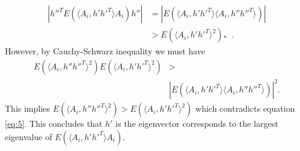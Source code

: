 \documentclass[10pt,journal,compsoc]{IEEEtran}
\newenvironment{proof}[1][Proof]{\begin{trivlist}
		\item[\hskip \labelsep {\bfseries #1}]}{\end{trivlist}}
\begin{document}
\begin{proof} [Proof of Theorem 4.2]
	\begin{align*}  | h''^T E(\langle A_{i},h' h'^T \rangle A_{i}) h''| &= |E(\langle A_{i},h' h'^T \rangle \langle A_{i},h'' h''^T \rangle)| \\
	&> E(\langle A_{i},h' h'^T \rangle ^2)  、.
	\end{align*}
	However, by Cauchy-Schwarz inequality we must have
	\begin{align*} E(\langle A_{i},h'' h''^T \rangle^2)  E(\langle A_{i},h' h'^T \rangle^2) &> \\
	&|E(\langle A_{i},h' h'^T \rangle \langle A_{i},h'' h''^T \rangle)|^2 .
	\end{align*}
	This implies $E(\langle A_{i},h'' h''^T \rangle^2) > E(\langle A_{i},h' h'^T \rangle^2)$ which contradicts equation \eqref{eq:5}. This concludes that $h'$ is the eigenvector corresponds to the largest eigenvalue of $E(\langle A_{i},h' h'^T \rangle A_{i})$. \\
	

\end{proof}
\end{document}
